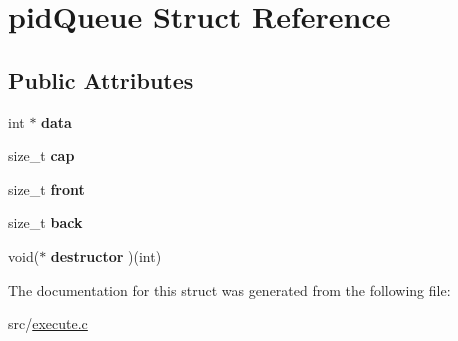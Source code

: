 \hypertarget{structpidQueue}{}\section{pid\+Queue Struct Reference}
\label{structpidQueue}
\subsection*{Public Attributes}
\begin{DoxyCompactItemize}
\item 
int $\ast$ {\bfseries data}\hypertarget{structpidQueue_a07baedf6a0cfffa3a486b59009e1f452}{}\label{structpidQueue_a07baedf6a0cfffa3a486b59009e1f452}

\item 
size\+\_\+t {\bfseries cap}\hypertarget{structpidQueue_a137fd5cf29270892a5705e4dae565d3a}{}\label{structpidQueue_a137fd5cf29270892a5705e4dae565d3a}

\item 
size\+\_\+t {\bfseries front}\hypertarget{structpidQueue_a4adb0f360a2eaa406cf1ceccaa2e5391}{}\label{structpidQueue_a4adb0f360a2eaa406cf1ceccaa2e5391}

\item 
size\+\_\+t {\bfseries back}\hypertarget{structpidQueue_ad00dc64ec689dc741f65055d5c417648}{}\label{structpidQueue_ad00dc64ec689dc741f65055d5c417648}

\item 
void($\ast$ {\bfseries destructor} )(int)\hypertarget{structpidQueue_a59690bd379c0652a42f91321790f6cb6}{}\label{structpidQueue_a59690bd379c0652a42f91321790f6cb6}

\end{DoxyCompactItemize}


The documentation for this struct was generated from the following file\+:\begin{DoxyCompactItemize}
\item 
src/\hyperlink{execute_8c}{execute.\+c}\end{DoxyCompactItemize}

